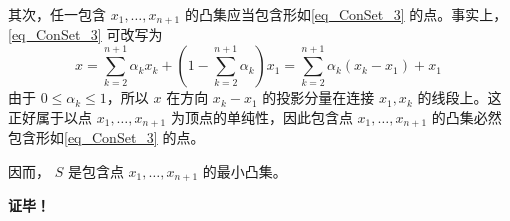 其次，任一包含 $x_1,\ldots,x_{n+1}$ 的凸集应当包含形如\autoref{eq_ConSet_3} 的点。事实上，\autoref{eq_ConSet_3} 可改写为
\begin{equation}
x=\sum_{k=2}^{n+1}\alpha_kx_k+(1-\sum_{k=2}^{n+1}\alpha_k)x_1=\sum_{k=2}^{n+1}\alpha_k(x_k-x_1)+x_1~
\end{equation}
由于 $0\leq\alpha_k\leq1$，所以 $x$ 在方向 $x_k-x_1$ 的投影分量在连接 $x_1,x_k$ 的线段上。这正好属于以点 $x_1,\ldots,x_{n+1}$ 为顶点的单纯性，因此包含点 $x_1,\ldots,x_{n+1}$ 的凸集必然包含形如\autoref{eq_ConSet_3} 的点。

因而， $S$ 是包含点 $x_1,\ldots,x_{n+1}$ 的最小凸集。

\textbf{证毕！}























